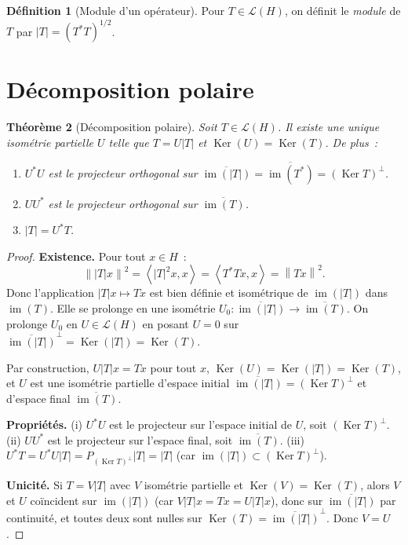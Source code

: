 \documentclass[a4paper,12pt]{book}
\DeclareMathOperator{\im}{im}
\DeclareMathOperator{\Ker}{Ker}
\newcommand{\norm}[1]{\left\| #1 \right\|}
\newcommand{\abs}[1]{\left| #1 \right|}
\newcommand{\inner}[2]{\left\langle #1, #2 \right\rangle}
\theoremstyle{definition}
\newtheorem{definition}{Définition}[chapter]
\theoremstyle{plain}
\newtheorem{theoreme}[definition]{Théorème}
\theoremstyle{remark}
\begin{document}
\begin{definition}[Module d'un opérateur]
\label{def:module-op}
Pour $T \in \mathcal{L}(H)$, on définit le \emph{module} de $T$ par
$\abs{T} = (T^*T)^{1/2}$.
\end{definition}

\section{Décomposition polaire}

\begin{theoreme}[Décomposition polaire]
\label{thm:decomposition-polaire}
Soit $T \in \mathcal{L}(H)$. Il existe une unique isométrie partielle $U$ telle que
$T = U\abs{T}$ et $\Ker(U) = \Ker(T)$. De plus~:
\begin{enumerate}[label=(\roman*)]
  \item $U^*U$ est le projecteur orthogonal sur $\overline{\im(\abs{T})} = \overline{\im(T^*)} = (\Ker T)^\perp$.
  \item $UU^*$ est le projecteur orthogonal sur $\overline{\im(T)}$.
  \item $\abs{T} = U^*T$.
\end{enumerate}
\end{theoreme}

\begin{proof}
\textbf{Existence.} Pour tout $x \in H$~:
\[
  \norm{\abs{T}x}^2 = \inner{\abs{T}^2 x}{x} = \inner{T^*Tx}{x} = \norm{Tx}^2.
\]
Donc l'application $\abs{T}x \mapsto Tx$ est bien définie et isométrique de
$\im(\abs{T})$ dans $\im(T)$. Elle se prolonge en une isométrie
$U_0 : \overline{\im(\abs{T})} \to \overline{\im(T)}$. On prolonge $U_0$ en
$U \in \mathcal{L}(H)$ en posant $U = 0$ sur $\overline{\im(\abs{T})}^\perp = \Ker(\abs{T}) = \Ker(T)$.

Par construction, $U\abs{T}x = Tx$ pour tout $x$, $\Ker(U) = \Ker(\abs{T}) = \Ker(T)$,
et $U$ est une isométrie partielle d'espace initial
$\overline{\im(\abs{T})} = (\Ker T)^\perp$ et d'espace final $\overline{\im(T)}$.

\textbf{Propriétés.}
(i) $U^*U$ est le projecteur sur l'espace initial de $U$, soit $(\Ker T)^\perp$.
(ii) $UU^*$ est le projecteur sur l'espace final, soit $\overline{\im(T)}$.
(iii) $U^*T = U^*U\abs{T} = P_{(\Ker T)^\perp}\abs{T} = \abs{T}$ (car
$\im(\abs{T}) \subset (\Ker T)^\perp$).

\textbf{Unicité.} Si $T = V\abs{T}$ avec $V$ isométrie partielle et
$\Ker(V) = \Ker(T)$, alors $V$ et $U$ coïncident sur $\im(\abs{T})$ (car
$V\abs{T}x = Tx = U\abs{T}x$), donc sur $\overline{\im(\abs{T})}$ par continuité, et
toutes deux sont nulles sur $\Ker(T) = \overline{\im(\abs{T})}^\perp$. Donc $V = U$.
\end{proof}
\end{document}
